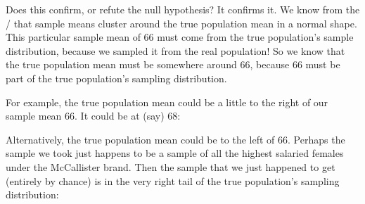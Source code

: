 \documentclass[../../../main.tex]{subfiles}
\begin{document}
\noindent
Does this confirm, or refute the null hypothesis? It confirms it. We know from the \CLT/ that sample means cluster around the true population mean in a normal shape. This particular sample mean of 66 must come from the true population's sample distribution, because we sampled it from the real population! So we know that the true population mean must be somewhere around 66, because 66 must be part of the true population's sampling distribution. 

For example, the true population mean could be a little to the right of our sample mean 66. It could be at (say) 68:

\begin{center}
\end{center}

\noindent
Alternatively, the true population mean could be to the left of 66. Perhaps the sample we took just happens to be a sample of all the highest salaried females under the McCallister brand. Then the sample that we just happened to get (entirely by chance) is in the very right tail of the true population's sampling distribution:
\end{document}
